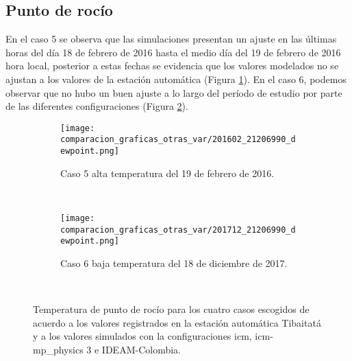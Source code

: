 %


\subsection{Punto de rocío}

En el caso 5 se observa que las simulaciones presentan un ajuste en las últimas horas del día 18 de febrero de 2016 hasta el medio día del 19 de febrero de 2016 hora local, posterior a estas fechas se evidencia que los valores modelados no se ajustan a los valores de la estación automática (Figura \ref{caso5_tiba_wrf_dp}). En el caso 6, podemos observar que no hubo un buen ajuste a lo largo del período de estudio por parte de las diferentes configuraciones (Figura \ref{caso6_tiba_wrf_dp}).\\


\begin{figure}[H]
\centering    
\begin{subfigure}[normla]{0.4\textwidth}
\caption{Caso 5 alta temperatura del 19 de febrero de 2016.}
\label{caso5_tiba_wrf_dp}
\texttt{[image: comparacion\_graficas\_otras\_var/201602\_21206990\_dewpoint.png]}
\end{subfigure}
~
\begin{subfigure}[normla]{0.4\textwidth}
\caption{Caso 6 baja temperatura del 18 de diciembre de 2017.}
\label{caso6_tiba_wrf_dp}
\texttt{[image: comparacion\_graficas\_otras\_var/201712\_21206990\_dewpoint.png]}
\end{subfigure}
~
    \caption{Temperatura de punto de rocío para los cuatro casos escogidos de acuerdo a los valores registrados en la estación automática Tibaitatá y a los valores simulados con la configuraciones icm, icm-mp\_physics 3 e IDEAM-Colombia.}
    \label{fig:wrf_dp_tibaitata}
\end{figure}


